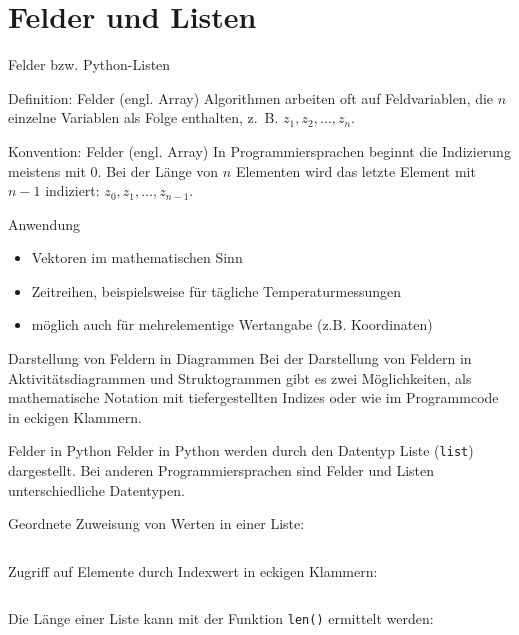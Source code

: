 \documentclass[xelatex,aspectratio=169]{beamer}
\begin{document}
\section{Felder und Listen}

\begin{frame}{Felder bzw. Python-Listen}
  \begin{block}{Definition: Felder (engl. Array)}
    Algorithmen arbeiten oft auf Feldvariablen, die \(n\) einzelne Variablen als Folge enthalten, z.~B. \( z_1, z_2, \ldots, z_n \).
  \end{block}

  \begin{block}{Konvention: Felder (engl. Array)}
    In Programmiersprachen beginnt die Indizierung meistens mit 0. Bei der Länge von \(n\) Elementen wird das letzte Element mit \(n-1\) indiziert: \( z_0 , z_1, \ldots, z_{n-1} \).
  \end{block}

  \begin{exampleblock}{Anwendung}
    \begin{itemize}
      \item Vektoren im mathematischen Sinn
      \item Zeitreihen, beispielsweise für tägliche Temperaturmessungen
      \item möglich auch für mehrelementige Wertangabe (z.B. Koordinaten)
    \end{itemize}
  \end{exampleblock}

\end{frame}

\begin{frame}{Darstellung von Feldern in Diagrammen}
  Bei der Darstellung von Feldern in Aktivitätsdiagrammen und Struktogrammen gibt es zwei Möglichkeiten, als mathematische Notation mit tiefergestellten Indizes oder wie im Programmcode in eckigen Klammern.

  \tiny\centering
  
\end{frame}

\begin{frame}{Felder in Python}
  Felder in Python werden durch den Datentyp Liste (\texttt{list}) dargestellt. Bei anderen Programmiersprachen sind Felder und Listen unterschiedliche Datentypen.

  Geordnete Zuweisung von Werten in einer Liste:

  \inputminted[firstline=1, lastline=3]{python}{src/algorithmus_list.py}

  Zugriff auf Elemente durch Indexwert in eckigen Klammern:
  \inputminted[firstline=5, lastline=5]{python}{src/algorithmus_list.py}

  Die Länge einer Liste kann mit der Funktion \texttt{len()} ermittelt werden:
  \inputminted[firstline=7, lastline=7]{python}{src/algorithmus_list.py}
\end{frame}
\end{document}
